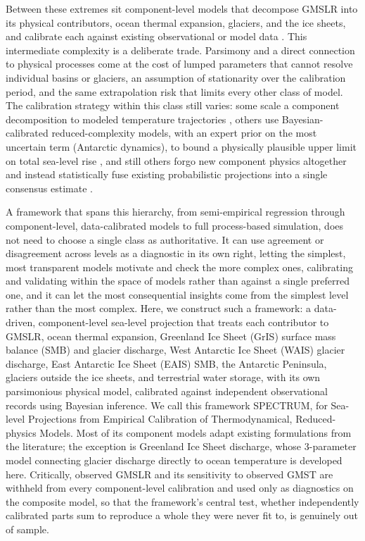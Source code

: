 \documentclass[12pt]{article}
\begin{document}
Between these extremes sit component-level models that decompose GMSLR
into its physical contributors, ocean thermal expansion, glaciers, and the
ice sheets, and calibrate each against existing observational or model
data \citep{Kopp2014,Mengel2016,Wong2017}. This intermediate complexity is
a deliberate trade. Parsimony and a direct connection to physical
processes come at the cost of lumped parameters that cannot resolve
individual basins or glaciers, an assumption of stationarity over the
calibration period, and the same extrapolation risk that limits every
other class of model. The calibration strategy within this class still
varies: some scale a component decomposition to modeled temperature
trajectories \citep{Perrette2013}, others use Bayesian-calibrated
reduced-complexity models, with an expert prior on the most uncertain term
(Antarctic dynamics), to bound a physically plausible upper limit on total
sea-level rise \citep{Sriver2012}, and still others forgo new
component physics altogether and instead statistically fuse existing
probabilistic projections into a single consensus estimate
\citep{Grandey2024}.

A framework that spans this hierarchy, from semi-empirical regression
through component-level, data-calibrated models to full process-based
simulation, does not need to choose a single class as authoritative. It can use agreement
or disagreement across levels as a diagnostic in its own right, letting the
simplest, most transparent models motivate and check the more complex
ones, calibrating and validating within the space of models rather than
against a single preferred one, and it can let the most consequential
insights come from the simplest level rather than the most complex. Here,
we construct such a framework:
a data-driven, component-level sea-level projection that treats each
contributor to GMSLR, ocean thermal expansion, Greenland Ice Sheet (GrIS)
surface mass balance (SMB) and glacier discharge, West Antarctic Ice Sheet
(WAIS) glacier discharge, East Antarctic Ice Sheet (EAIS) SMB, the
Antarctic Peninsula, glaciers outside the ice sheets, and terrestrial water
storage, with its own parsimonious physical model, calibrated against
independent observational records using Bayesian inference. We call this
framework SPECTRUM, for Sea-level Projections from Empirical Calibration
of Thermodynamical, Reduced-physics Models. Most of its component models
adapt existing formulations from the literature; the exception is
Greenland Ice Sheet discharge, whose 3-parameter model connecting glacier
discharge directly to ocean temperature is developed here. Critically,
observed GMSLR and its sensitivity to observed GMST are withheld from
every component-level calibration and used only as diagnostics on the
composite model, so that the framework's central test, whether
independently calibrated parts sum to reproduce a whole they were never
fit to, is genuinely out of sample.
\end{document}
